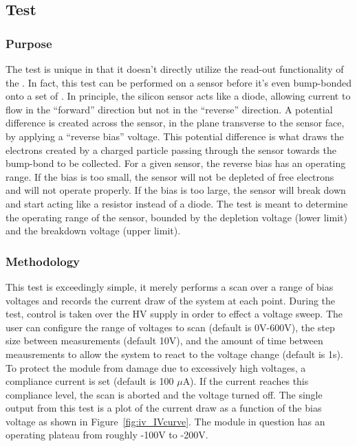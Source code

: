 
\newpage

\subsection{\iv Test}
\label{ss:iv}

\subsubsection{Purpose}

The \iv test is unique in that it doesn't directly utilize the read-out functionality of the \roc.
In fact, this test can be performed on a sensor before it's even bump-bonded onto a set of \rocs.
In principle, the silicon sensor acts like a diode, 
allowing current to flow in the ``forward'' direction but not in the ``reverse'' direction.
A potential difference is created across the sensor, in the plane transverse to the sensor face,
by applying a ``reverse bias'' voltage.
This potential difference is what draws the electrons created by a charged particle passing through the sensor 
towards the bump-bond to be collected.
For a given sensor, the reverse bias has an operating range.
If the bias is too small, the sensor will not be depleted of free electrons and will not operate properly.
If the bias is too large, the sensor will break down and start acting like a resistor instead of a diode.
The \iv test is meant to determine the operating range of the sensor, 
bounded by the depletion voltage (lower limit) and the breakdown voltage (upper limit).

\subsubsection{Methodology}

This test is exceedingly simple, it merely performs a scan over a range of bias voltages
and records the current draw of the system at each point.
During the test, control is taken over the HV supply in order to effect a voltage sweep.
The user can configure the range of voltages to scan (default is 0V-600V),
the step size between measurements (default 10V), 
and the amount of time between meausrements to allow the system to react to the voltage change (default is 1s).
To protect the module from damage due to excessively high voltages, a compliance current is set (default is 100 $\mu$A).
If the current reaches this compliance level, the scan is aborted and the voltage turned off.
The single output from this test is a plot of the current draw as a function of the bias voltage
as shown in Figure~\ref{fig:iv_IVcurve}.
The module in question has an operating plateau from roughly -100V to -200V.

